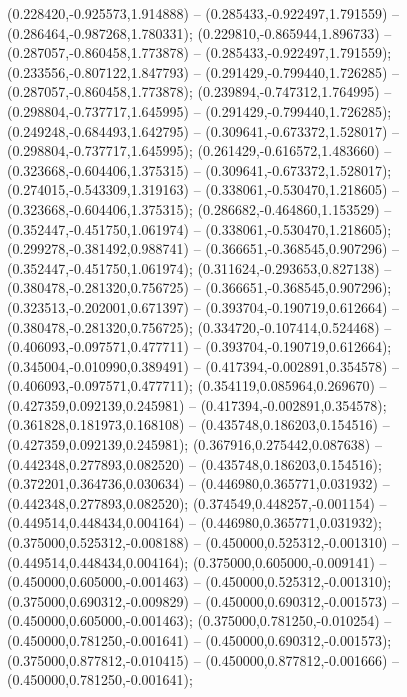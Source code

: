  (0.228420,-0.925573,1.914888) -- (0.285433,-0.922497,1.791559) -- (0.286464,-0.987268,1.780331);
 (0.229810,-0.865944,1.896733) -- (0.287057,-0.860458,1.773878) -- (0.285433,-0.922497,1.791559);
 (0.233556,-0.807122,1.847793) -- (0.291429,-0.799440,1.726285) -- (0.287057,-0.860458,1.773878);
 (0.239894,-0.747312,1.764995) -- (0.298804,-0.737717,1.645995) -- (0.291429,-0.799440,1.726285);
 (0.249248,-0.684493,1.642795) -- (0.309641,-0.673372,1.528017) -- (0.298804,-0.737717,1.645995);
 (0.261429,-0.616572,1.483660) -- (0.323668,-0.604406,1.375315) -- (0.309641,-0.673372,1.528017);
 (0.274015,-0.543309,1.319163) -- (0.338061,-0.530470,1.218605) -- (0.323668,-0.604406,1.375315);
 (0.286682,-0.464860,1.153529) -- (0.352447,-0.451750,1.061974) -- (0.338061,-0.530470,1.218605);
 (0.299278,-0.381492,0.988741) -- (0.366651,-0.368545,0.907296) -- (0.352447,-0.451750,1.061974);
 (0.311624,-0.293653,0.827138) -- (0.380478,-0.281320,0.756725) -- (0.366651,-0.368545,0.907296);
 (0.323513,-0.202001,0.671397) -- (0.393704,-0.190719,0.612664) -- (0.380478,-0.281320,0.756725);
 (0.334720,-0.107414,0.524468) -- (0.406093,-0.097571,0.477711) -- (0.393704,-0.190719,0.612664);
 (0.345004,-0.010990,0.389491) -- (0.417394,-0.002891,0.354578) -- (0.406093,-0.097571,0.477711);
 (0.354119,0.085964,0.269670) -- (0.427359,0.092139,0.245981) -- (0.417394,-0.002891,0.354578);
 (0.361828,0.181973,0.168108) -- (0.435748,0.186203,0.154516) -- (0.427359,0.092139,0.245981);
 (0.367916,0.275442,0.087638) -- (0.442348,0.277893,0.082520) -- (0.435748,0.186203,0.154516);
 (0.372201,0.364736,0.030634) -- (0.446980,0.365771,0.031932) -- (0.442348,0.277893,0.082520);
 (0.374549,0.448257,-0.001154) -- (0.449514,0.448434,0.004164) -- (0.446980,0.365771,0.031932);
 (0.375000,0.525312,-0.008188) -- (0.450000,0.525312,-0.001310) -- (0.449514,0.448434,0.004164);
 (0.375000,0.605000,-0.009141) -- (0.450000,0.605000,-0.001463) -- (0.450000,0.525312,-0.001310);
 (0.375000,0.690312,-0.009829) -- (0.450000,0.690312,-0.001573) -- (0.450000,0.605000,-0.001463);
 (0.375000,0.781250,-0.010254) -- (0.450000,0.781250,-0.001641) -- (0.450000,0.690312,-0.001573);
 (0.375000,0.877812,-0.010415) -- (0.450000,0.877812,-0.001666) -- (0.450000,0.781250,-0.001641);
